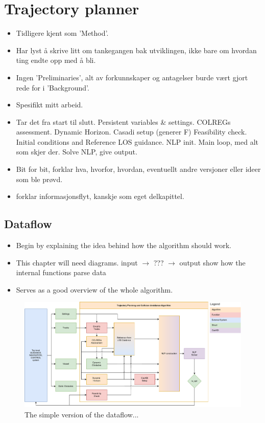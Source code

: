\section{Trajectory planner}
\begin{itemize}
    \item Tidligere kjent som 'Method'.
    \item Har lyst å skrive litt om tankegangen bak utviklingen, ikke bare om hvordan ting endte opp med å bli.
    \item Ingen 'Preliminaries', alt av forkunnskaper og antagelser burde vært gjort rede for i 'Background'.
    \item Spesifikt mitt arbeid.
    \item Tar det fra start til slutt. 
    \subitem Persistent variables \& settings.
    \subitem COLREGs assessment.
    \subitem Dynamic Horizon.
    \subitem Casadi setup (generer F)
    \subitem Feasibility check.
    \subitem Initial conditions and Reference LOS guidance.
    \subitem NLP init.
    \subitem Main loop, med alt som skjer der.
    \subitem Solve NLP, give output.
    \item Bit for bit, forklar hva, hvorfor, hvordan, eventuellt andre versjoner eller ideer som ble prøvd.
    \item forklar informasjonsflyt, kanskje som eget delkapittel. 
\end{itemize}

\subsection{Dataflow}
\begin{itemize}
    \item Begin by explaining the idea behind how the algorithm should work.
    \item This chapter will need diagrams.
    \subitem input $\rightarrow$ ??? $\rightarrow$ output
    \subitem show how the internal functions parse data
    \item Serves as a good overview of the whole algorithm.
\end{itemize}

\begin{figure}
    \label{FIG: Dataflow chart}
    \includegraphics[width=\textwidth]{Images/SimpleSystem.pdf}
    \caption{The simple version of the dataflow...}
\end{figure}

